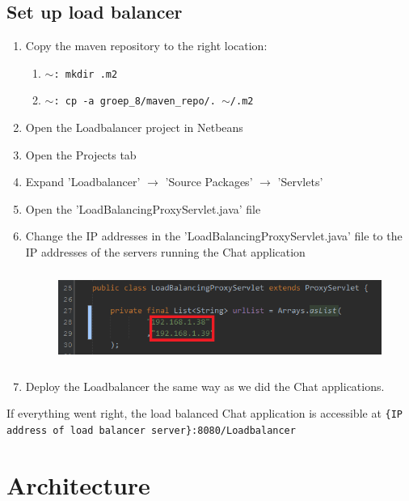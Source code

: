 \documentclass[11pt]{article}
\begin{document}
\subsection{Set up load balancer}
\begin{enumerate}
	\item Copy the maven repository to the right location:
	\begin{enumerate}
		\item \texttt{$\sim$: mkdir .m2}
		\item \texttt{$\sim$: cp -a groep\_8/maven\_repo/. $\sim$/.m2 }
	\end{enumerate}
	\item Open the Loadbalancer project in Netbeans
	\item Open the Projects tab
	\item Expand 'Loadbalancer' $\rightarrow$ 'Source Packages' $\rightarrow$ 'Servlets'
	\item Open the 'LoadBalancingProxyServlet.java' file
	\item Change the IP addresses in the 'LoadBalancingProxyServlet.java' file to the IP addresses of the servers running the Chat application
	\begin{figure}[H]
		\centering
		\includegraphics[height=30mm]{set_server_ip_addresses.png}
	\end{figure}
	\item Deploy the Loadbalancer the same way as we did the Chat applications.
\end{enumerate}
If everything went right, the load balanced Chat application is accessible at \texttt{\{IP address of load balancer server\}:8080/Loadbalancer}
\section{Architecture}
\end{document}
